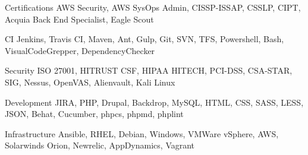 


\begin{cvskills}


\cvskill
{Certifications}
{AWS Security, AWS SysOps Admin, CISSP-ISSAP, CSSLP, CIPT, Acquia Back End Specialist, Eagle Scout }

\cvskill
{CI}
{Jenkins, Travis CI, Maven, Ant, Gulp, Git, SVN, TFS, Powershell, Bash, VisualCodeGrepper, DependencyChecker }

\cvskill
{Security}
{ISO 27001, HITRUST CSF, HIPAA HITECH, PCI-DSS, CSA-STAR, SIG, Nessus, OpenVAS, Alienvault, Kali Linux }

\cvskill
{Development}
{JIRA, PHP, Drupal, Backdrop, MySQL, HTML, CSS, SASS, LESS, JSON, Behat, Cucumber, phpcs, phpmd, phplint }

\cvskill
{Infrastructure}
{Ansible, RHEL, Debian, Windows, VMWare vSphere, AWS, Solarwinds Orion, Newrelic, AppDynamics, Vagrant }




\end{cvskills}
